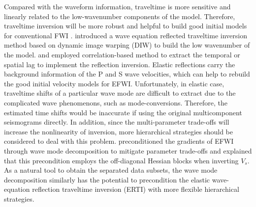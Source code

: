 \documentclass[extra,mreferee]{gji}
\begin{document}
Compared with the waveform information,
traveltime is more sensitive and linearly related to
the low-wavenumber components of the model. Therefore, traveltime inversion will be more robust and helpful to
build good initial models for conventional FWI
\cite[]{WangEtAl2014}.
\cite{Ma2013} introduced a wave equation reflected traveltime inversion method
based on dynamic image warping (DIW) to build the low wavenumber of the model.
\cite{Chi2015} and \cite{Wang2015} employed correlation-based method to extract the
temporal or spatial lag to implement the reflection inversion.
Elastic reflections carry the background information of the P and S wave velocities,
which can help to rebuild the good initial velocity models for EFWI.
Unfortunately, in elastic case, traveltime shifts of a particular wave mode are difficult
to extract due to the complicated wave phenomenons, such as mode-conversions.
Therefore, the estimated time shifts would be inaccurate if using the
original multicomponent seismograms directly.
In addition, since the multi-parameter trade-offs will increase the
nonlinearity of inversion, more hierarchical strategies should be considered to deal
with this problem.
\cite{WangEtAl2017}
preconditioned the gradients of EFWI through wave mode decomposition to mitigate
parameter trade-offs and explained that this precondition employs the off-diagonal Hessian blocks
when inverting $V_s$.
As a natural tool to obtain the separated data subsets, the wave mode decomposition similarly
has the potential to precondition the elastic wave-equation reflection traveltime
inversion (ERTI) with more flexible hierarchical strategies.

\end{document}
